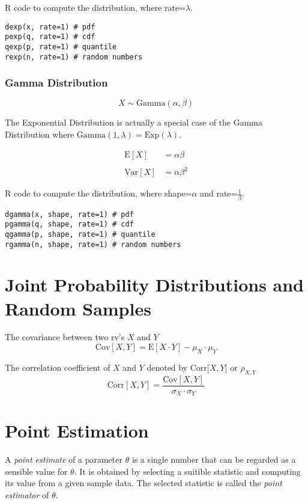 \documentclass{article}
\begin{document}
R code to compute the distribution, where rate=$\lambda$.
\begin{lstlisting}
dexp(x, rate=1) # pdf
pexp(q, rate=1) # cdf
qexp(p, rate=1) # quantile
rexp(n, rate=1) # random numbers
\end{lstlisting}


\subsubsection*{Gamma Distribution}
$$ X \sim \mathrm{Gamma}(\alpha, \beta)$$

The Exponential Distribution is actually a special case of the Gamma Distribution where $\mathrm{Gamma}(1, \lambda) = \mathrm{Exp}(\lambda)$.

\begin{align*}
    \mathrm{E}[X] &= \alpha \beta \\ \\
    \mathrm{Var}[X] &= \alpha \beta^2
\end{align*}

R code to compute the distribution, where shape=$\alpha$ and rate=$\frac{1}{\beta}$.
\begin{lstlisting}
dgamma(x, shape, rate=1) # pdf
pgamma(q, shape, rate=1) # cdf
qgamma(p, shape, rate=1) # quantile
rgamma(n, shape, rate=1) # random numbers
\end{lstlisting}

\section*{Joint Probability Distributions and Random Samples}

The covariance between two rv's $X$ and $Y$
$$ \mathrm{Cov}[X, Y] = \mathrm{E}[X \cdot Y] - \mu_X \cdot \mu_Y $$

The correlation coefficient of $X$ and $Y$ denoted by Corr[$X, Y$] or $\rho_{X,Y}$
$$ \mathrm{Corr}[X,Y] = \frac{\mathrm{Cov}[X, Y]}{\sigma_X \cdot \sigma_Y} $$

\section*{Point Estimation}
A \textit{point estimate} of a parameter $\theta$ is a single number that can be regarded as a sensible value for $\theta$. It is obtained by selecting a suitible statistic and computing its value from a given sample data. The selected statistic is called the \textit{point estimator} of $\theta$.
\end{document}

